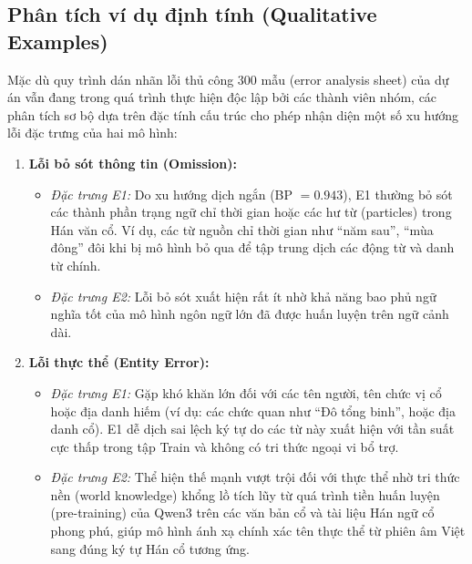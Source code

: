 \subsection{Phân tích ví dụ định tính (Qualitative Examples)}

Mặc dù quy trình dán nhãn lỗi thủ công 300 mẫu (error analysis sheet) của dự án vẫn đang trong quá trình thực hiện độc lập bởi các thành viên nhóm, các phân tích sơ bộ dựa trên đặc tính cấu trúc cho phép nhận diện một số xu hướng lỗi đặc trưng của hai mô hình:

\begin{enumerate}
    \item \textbf{Lỗi bỏ sót thông tin (Omission):}
    \begin{itemize}
        \item \textit{Đặc trưng E1:} Do xu hướng dịch ngắn (BP $= 0.943$), E1 thường bỏ sót các thành phần trạng ngữ chỉ thời gian hoặc các hư từ (particles) trong Hán văn cổ. Ví dụ, các từ nguồn chỉ thời gian như ``năm sau'', ``mùa đông'' đôi khi bị mô hình bỏ qua để tập trung dịch các động từ và danh từ chính.
        \item \textit{Đặc trưng E2:} Lỗi bỏ sót xuất hiện rất ít nhờ khả năng bao phủ ngữ nghĩa tốt của mô hình ngôn ngữ lớn đã được huấn luyện trên ngữ cảnh dài.
    \end{itemize}

    \item \textbf{Lỗi thực thể (Entity Error):}
    \begin{itemize}
        \item \textit{Đặc trưng E1:} Gặp khó khăn lớn đối với các tên người, tên chức vị cổ hoặc địa danh hiếm (ví dụ: các chức quan như ``Đô tổng binh'', hoặc địa danh cổ). E1 dễ dịch sai lệch ký tự do các từ này xuất hiện với tần suất cực thấp trong tập Train và không có tri thức ngoại vi bổ trợ.
        \item \textit{Đặc trưng E2:} Thể hiện thế mạnh vượt trội đối với thực thể nhờ tri thức nền (world knowledge) khổng lồ tích lũy từ quá trình tiền huấn luyện (pre-training) của Qwen3 trên các văn bản cổ và tài liệu Hán ngữ cổ phong phú, giúp mô hình ánh xạ chính xác tên thực thể từ phiên âm Việt sang đúng ký tự Hán cổ tương ứng.
    \end{itemize}


\end{enumerate}
